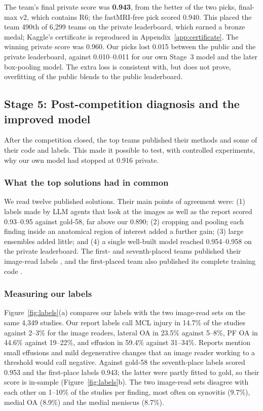 The team's final private score was \textbf{0.943}, from the better of the two picks, final-max v2, which contains R6; the fastMRI-free pick scored 0.940. This placed the team 490th of 6,299 teams on the private leaderboard, which earned a bronze medal; Kaggle's certificate is reproduced in Appendix~\ref{app:certificate}. The winning private score was 0.960. Our picks lost 0.015 between the public and the private leaderboard, against 0.010--0.011 for our own Stage~3 model and the later box-pooling model. The extra loss is consistent with, but does not prove, overfitting of the public blends to the public leaderboard.

\subsection{Stage 5: Post-competition diagnosis and the improved model}
\label{sec:impl-post}

After the competition closed, the top teams published their methods and some of their code and labels. This made it possible to test, with controlled experiments, why our own model had stopped at 0.916 private.

\subsubsection{What the top solutions had in common} We read twelve published solutions. Their main points of agreement were: (1) labels made by LLM agents that look at the images as well as the report scored 0.93--0.95 against gold-58, far above our 0.890; (2) cropping and pooling each finding inside an anatomical region of interest added a further gain; (3) large ensembles added little; and (4) a single well-built model reached 0.954--0.958 on the private leaderboard. The first- and seventh-placed teams published their image-read labels \cite{tascj_agentlabels,songqizhou_llmlabels}, and the first-placed team also published its complete training code \cite{tascj_boxpool,tascj_roidetector,tascj_sideclassifier}.

\subsubsection{Measuring our labels} Figure~\ref{fig:labels}(a) compares our labels with the two image-read sets on the same 4,349 studies. Our report labels call MCL injury in 14.7\% of the studies against 2--3\% for the image readers, lateral OA in 23.5\% against 5--8\%, PF OA in 44.6\% against 19--22\%, and effusion in 59.4\% against 31--34\%. Reports mention small effusions and mild degenerative changes that an image reader working to a threshold would call negative. Against gold-58 the seventh-place labels scored 0.953 and the first-place labels 0.943; the latter were partly fitted to gold, so their score is in-sample (Figure~\ref{fig:labels}b). The two image-read sets disagree with each other on 1--10\% of the studies per finding, most often on synovitis (9.7\%), medial OA (8.9\%) and the medial meniscus (8.7\%).


